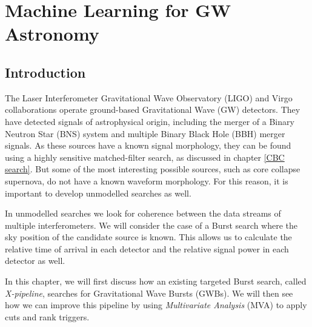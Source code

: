 \documentclass[12pt,twoside,a4paper]{report}
\begin{document}
\chapter{Machine Learning for GW Astronomy}
\section{\label{intro}Introduction}
The Laser Interferometer Gravitational Wave Observatory (LIGO) and Virgo collaborations operate ground-based Gravitational Wave (GW) detectors. They have detected signals of astrophysical origin, including the merger of a Binary Neutron Star (BNS) system and multiple Binary Black Hole (BBH) merger signals. As these sources have a known signal morphology, they can be found using a highly sensitive matched-filter search, as discussed in chapter \ref{CBC search}. But some of the most interesting possible sources, such as core collapse supernova, do not have a known waveform morphology. For this reason, it is important to develop unmodelled searches as well. 

In unmodelled searches we look for coherence between the data streams of multiple interferometers. We will consider the case of a Burst search where the sky position of the candidate source is known. This allows us to calculate the relative time of arrival in each detector and the relative signal power in each detector as well. 


In this chapter, we will first discuss how an existing targeted Burst search, called \textit{X-pipeline}, searches for Gravitational Wave Bursts (GWBs). We will then see how we can improve this pipeline by using \textit{Multivariate Analysis} (MVA) to apply cuts and rank triggers.  
\end{document}
